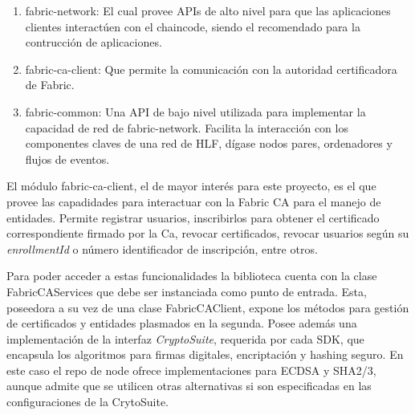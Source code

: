 \begin{enumerate}
	\item fabric-network: El cual provee APIs de alto nivel para que las aplicaciones clientes interact\'uen con el chaincode, siendo el recomendado para la contrucci\'on de aplicaciones.
	
	\item fabric-ca-client: Que permite la comunicaci\'on con la autoridad certificadora de Fabric.
	
	\item fabric-common: Una API de bajo nivel utilizada para implementar la capacidad de red de fabric-network. Facilita la interacci\'on con los componentes claves de una red de HLF, d\'igase nodos pares, ordenadores y flujos de eventos.
\end{enumerate}


El m\'odulo fabric-ca-client, el de mayor inter\'es para este proyecto, es el que provee las capadidades para interactuar con la Fabric CA para el manejo de entidades.  Permite registrar usuarios, inscribirlos para obtener el certificado correspondiente firmado por la Ca,  revocar certificados, revocar usuarios seg\'un su \emph{enrollmentId} o n\'umero identificador de inscripci\'on, entre otros.

Para poder acceder a estas funcionalidades la biblioteca cuenta con la clase FabricCAServices que debe ser instanciada como punto de entrada. Esta, poseedora a su vez de una clase FabricCAClient, expone los m\'etodos para gesti\'on de certificados y entidades plasmados en la segunda. Posee adem\'as una implementaci\'on de la interfaz \emph{CryptoSuite}, requerida por cada SDK, que encapsula los algoritmos para firmas digitales, encriptaci\'on y hashing seguro. En este caso el repo de node ofrece implementaciones para ECDSA y SHA2/3, aunque admite que se utilicen otras alternativas si son especificadas en las configuraciones de la CrytoSuite.




